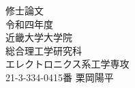 \begin{titlepage}
\begin{center}
\LARGE
\vspace*{1cm}

\Huge{修\hspace{2zw}士\hspace{2zw}論\hspace{2zw}文}\\
\vspace{1cm}
\huge{令和四年度}\\

\vspace*{9cm}
\vspace*{2cm}
\huge{近畿大学大学院\\
総合理工学研究科\\
エレクトロニクス系工学専攻\\
21-3-334-0415番 \hspace{0.5zw} 栗\hspace{0.5zw}岡\hspace{0.5zw}陽\hspace{0.5zw}平
}
\end{center}
\end{titlepage}
 

